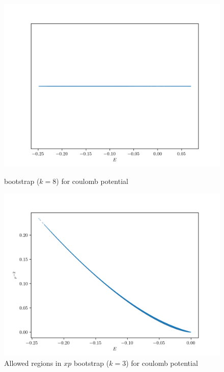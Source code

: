 \documentclass[aps, preprint,amsmath, amssymb]{revtex4-2}
\begin{document}
\begin{figure}
	\centering
	\begin{minipage}{0.45\textwidth}
		\includegraphics[width=\linewidth]{coulomb.png}
		\caption{  bootstrap ($k = 8$) for coulomb potential}
		\label{fig:coulomb0}
	\end{minipage}
	\hfill
	\begin{minipage}{0.45\textwidth}
		\includegraphics[width=\linewidth]{coulomb_double.png}
		\caption{Allowed regions in $xp$ bootstrap ($k = 3$) for coulomb potential}
		\label{fig:coulomb1}
	\end{minipage}

\end{figure}
\end{document}
